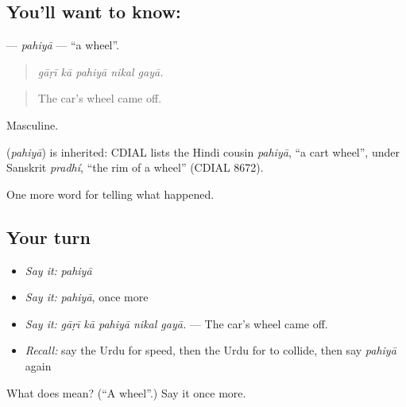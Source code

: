 \subsection*{You'll want to know: }
\textbf{} — \emph{pahiyā} — \textquotedblleft{}a wheel\textquotedblright{}.

\begin{quote}
    
\end{quote}

\begin{quote}
\emph{gāṛī kā pahiyā nikal gayā.}
\end{quote}

\begin{quote}
The car's wheel came off.
\end{quote}

Masculine.

\begin{cousinweb}
\textbf{} (\emph{pahiyā}) is inherited: CDIAL lists the Hindi cousin \emph{pahiyā}, \textquotedblleft{}a cart wheel\textquotedblright{}, under Sanskrit \emph{pradhí}, \textquotedblleft{}the rim of a wheel\textquotedblright{} (CDIAL 8672).
\end{cousinweb}

\begin{grammarlens}[title={What you've built}]
One more word for telling what happened.
\end{grammarlens}

\subsection*{Your turn}
\begin{itemize}
\raggedright
  \item \emph{Say it:} \emph{pahiyā}
  \item \emph{Say it:} \emph{pahiyā}, once more
  \item \emph{Say it:} \emph{gāṛī kā pahiyā nikal gayā.} — The car's wheel came off.
  \item \emph{Recall:} say the Urdu for speed, then the Urdu for to collide, then say \emph{pahiyā} again
\end{itemize}

\begin{tcolorbox}[breakable,colback=teal!4,colframe=teal!35!black,title={Before you move on}]
What does  mean? (\textquotedblleft{}A wheel\textquotedblright{}.) Say it once more.
\end{tcolorbox}
